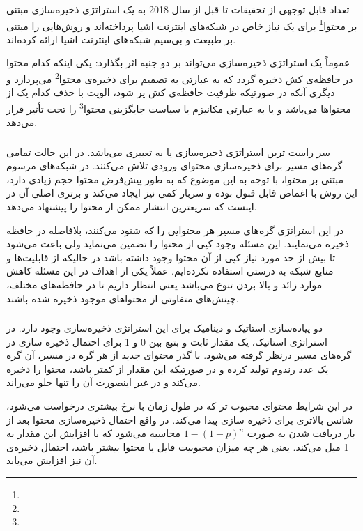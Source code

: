 تعداد قابل توجهی از تحقیقات تا قبل از سال 2018 به یک استراتژی ذخیره‌سازی مبتنی بر محتوا\footnote{} برای یک نیاز خاص در شبکه‌های اینترنت اشیا پرداخته‌اند و روش‌هایی را مبتنی بر طبیعت  و بی‌سیم شبکه‌های اینترنت اشیا ارائه کرده‌اند. 

عموماً یک استراتژی ذخیره‌سازی می‌تواند بر دو جنبه اثر بگذارد: یکی اینکه کدام محتوا در حافظه‌ی کش ذخیره گردد که به عبارتی به تصمیم برای ذخیره‌ی محتوا\footnote{} می‌پردازد و دیگری آنکه در صورتیکه ظرفیت حافظه‌ی کش پر شود، الویت با حذف کدام یک از محتواها می‌باشد و یا به عبارتی مکانیزم یا سیاست جایگزینی محتوا\footnote{} را تحت تأثیر قرار می‌دهد. 

\subsubsection{}
سر راست ترین استراتژی ذخیره‌سازی  یا به تعبیری  می‌باشد. در این حالت تمامی گره‌های مسیر برای ذخیره‌سازی محتوای ورودی تلاش می‌کنند. در شبکه‌های مرسوم مبتنی بر محتوا، با توجه به این موضوع که به طور پیش‌فرض محتوا حجم زیادی دارد، این روش با اغماض قابل قبول بوده و سربار کمی نیز ایجاد می‌کند و برتری اصلی آن در اینست که سریعترین انتشار ممکن از محتوا را پیشنهاد می‌دهد.

در این استراتژی گره‌های مسیر هر محتوایی را که شنود می‌کنند، بلافاصله در حافظه ذخیره می‌نمایند. این مسئله وجود کپی از محتوا را تضمین می‌نماید ولی باعث می‌شود تا بیش از حد مورد نیاز کپی از آن محتوا وجود داشته باشد در حالیکه از قابلیت‌ها و منابع شبکه به درستی استفاده نکرده‌ایم. عملاً یکی از اهداف در این مسئله کاهش موارد زائد و بالا بردن تنوع می‌باشد یعنی انتظار داریم تا در حافظه‌های مختلف، چینش‌های متفاوتی از محتواهای موجود ذخیره شده باشند. 
\subsubsection{}
دو پیاده‌سازی استاتیک و دینامیک برای این استراتژی ذخیره‌سازی وجود دارد. در استراتژی استاتیک، یک مقدار ثابت  و بتبع بین 0 و 1 برای احتمال ذخیره سازی در گره‌های مسیر درنظر گرفته می‌شود. با گذر محتوای جدید از هر گره در مسیر، آن گره یک عدد رندوم تولید کرده و در صورتیکه این مقدار از  کمتر باشد، محتوا را ذخیره می‌کند و در غیر اینصورت آن را تنها جلو می‌راند. 

در این شرایط محتوای محبوب تر که در طول زمان با نرخ بیشتری درخواست می‌شود،‌ شانس بالاتری برای ذخیره سازی پیدا می‌کند. در واقع احتمال ذخیره‌سازی محتوا بعد از  بار دریافت شدن به صورت $1-(1-p)^n$ محاسبه می‌شود که با افزایش  این مقدار به 1 میل می‌کند. یعنی هر چه میزان محبوبیت فایل یا محتوا بیشتر باشد، احتمال ذخیره‌ی آن نیز افزایش می‌یابد. 

